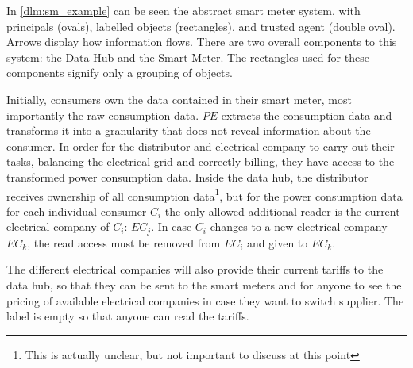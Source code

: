 In \cref{dlm:sm_example} can be seen the abstract smart meter system, with principals (ovals), labelled objects (rectangles), and trusted agent (double oval).
Arrows display how information flows.
There are two overall components to this system: the Data Hub and the Smart Meter.
The rectangles used for these components signify only a grouping of objects.

Initially, consumers own the data contained in their smart meter, most importantly the raw consumption data.
$PE$ extracts the consumption data and transforms it into a granularity that does not reveal information about the consumer.
In order for the distributor and electrical company to carry out their tasks, balancing the electrical grid and correctly billing, they have access to the transformed power consumption data.
Inside the data hub, the distributor receives ownership of all consumption data\footnote{This is actually unclear, but not important to discuss at this point}, but for the power consumption data for each individual consumer $C_i$ the only allowed additional reader is the current electrical company of $C_i$: $EC_j$.
In case $C_i$ changes to a new electrical company $EC_k$, the read access must be removed from $EC_i$ and given to $EC_k$.

The different electrical companies will also provide their current tariffs to the data hub, so that they can be sent to the smart meters and for anyone to see the pricing of available electrical companies in case they want to switch supplier.
The label is empty so that anyone can read the tariffs.
